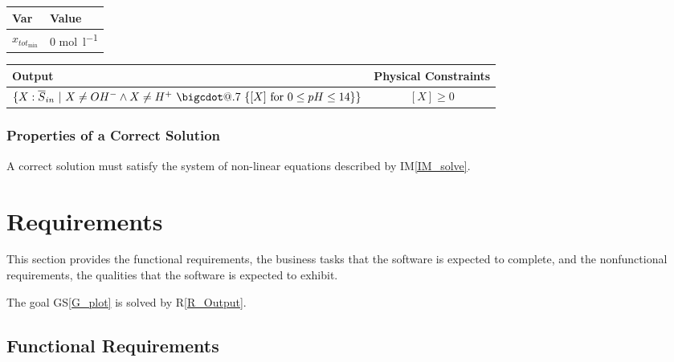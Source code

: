 \documentclass[12pt]{article}
\makeatletter
\newcommand*\bigcdot{\mathpalette\bigcdot@{.7}}
\newcommand*\bigcdot@[2]
  {\mathbin{\vcenter{\hbox{\scalebox{#2}{$\m@th#1\bullet$}}}}}
\newcommand{\gsref}[1]{GS\ref{#1}}
\newcommand{\iref}[1]{IM\ref{#1}}
\newcommand{\rref}[1]{R\ref{#1}}
\makeatother
\begin{document}
\begin{table}[!h]
\caption{Specification Parameter Values} \label{TblSpecParams}
\renewcommand{\arraystretch}{1.2}
\noindent \begin{longtable*}{l l} 
  \toprule
  \textbf{Var} & \textbf{Value} \\
  \midrule 
  $x_{{tot}_{\text{min}}}$ & 0 \si{\mole\per\litre}\\
  \bottomrule
\end{longtable*}
\end{table}

\begin{table}[!h]
\caption{Output Variables} \label{TblOutputVar}
\renewcommand{\arraystretch}{1.2}
\noindent \begin{longtable*}{l c} 
  \toprule
  \textbf{Output} & \textbf{Physical Constraints} \\
  \midrule 
  $\{X:\overline S_{in} ~|~ X \neq OH^- \land X \neq H^+ ~\bigcdot~ 
    \{[X]~\textrm{for}~0 \leq pH \leq 14\} \}$ & $[X] \geq 0$
  \\
  \bottomrule
\end{longtable*}
\end{table}

\subsubsection{Properties of a Correct Solution} \label{sec_CorrectSolution}

\noindent
A correct solution must satisfy the system of non-linear equations described by 
\iref{IM_solve}. 

\section{Requirements}

This section provides the functional requirements, the business tasks that the
software is expected to complete, and the nonfunctional requirements, the
qualities that the software is expected to exhibit.

The goal \gsref{G_plot} is solved by \rref{R_Output}.

\subsection{Functional Requirements}
\end{document}
